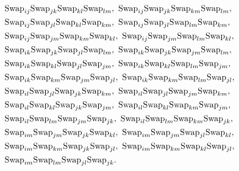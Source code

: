 \documentclass[12pt,dvipsnames,accepted=2016-08-18,a4paper,onecolumn]{quantumarticle}
\numberwithin{equation}{section}
\theoremstyle{definition}
\begin{document}
\begin{equation}\label{eq: quart}
 \begin{split}
 	&\textnormal{Swap}_{ij} \textnormal{Swap}_{jk} \textnormal{Swap}_{kl} \textnormal{Swap}_{lm}, \ 
 	\textnormal{Swap}_{ij} \textnormal{Swap}_{jk} \textnormal{Swap}_{km} \textnormal{Swap}_{lm}, \ \\
 	&\textnormal{Swap}_{ij} \textnormal{Swap}_{jl} \textnormal{Swap}_{kl} \textnormal{Swap}_{km}, \ 
 	\textnormal{Swap}_{ij} \textnormal{Swap}_{jl} \textnormal{Swap}_{lm} \textnormal{Swap}_{km}, \ \\
 	&\textnormal{Swap}_{ij} \textnormal{Swap}_{jm} \textnormal{Swap}_{km} \textnormal{Swap}_{kl}, \  
 	\textnormal{Swap}_{ij} \textnormal{Swap}_{jm} \textnormal{Swap}_{lm} \textnormal{Swap}_{kl}, \ \\
 	&\textnormal{Swap}_{ik} \textnormal{Swap}_{jk} \textnormal{Swap}_{jl} \textnormal{Swap}_{lm}, \ 
 	\textnormal{Swap}_{ik} \textnormal{Swap}_{jk} \textnormal{Swap}_{jm} \textnormal{Swap}_{lm}, \ \\
 	&\textnormal{Swap}_{ik} \textnormal{Swap}_{kl} \textnormal{Swap}_{jl} \textnormal{Swap}_{jm}, \ 
 	\textnormal{Swap}_{ik} \textnormal{Swap}_{kl} \textnormal{Swap}_{lm} \textnormal{Swap}_{jm}, \ \\
 	&\textnormal{Swap}_{ik} \textnormal{Swap}_{km} \textnormal{Swap}_{jm} \textnormal{Swap}_{jl}, \ 
 	\textnormal{Swap}_{ik} \textnormal{Swap}_{km} \textnormal{Swap}_{lm} \textnormal{Swap}_{jl}, \ \\
 	&\textnormal{Swap}_{il} \textnormal{Swap}_{jl} \textnormal{Swap}_{jk} \textnormal{Swap}_{km}, \ 
 	\textnormal{Swap}_{il} \textnormal{Swap}_{jl} \textnormal{Swap}_{jm} \textnormal{Swap}_{km}, \ \\
 	&\textnormal{Swap}_{il} \textnormal{Swap}_{kl} \textnormal{Swap}_{jk} \textnormal{Swap}_{jm}, \  
 	\textnormal{Swap}_{il} \textnormal{Swap}_{kl} \textnormal{Swap}_{km} \textnormal{Swap}_{jm}, \ \\
 	&\textnormal{Swap}_{il} \textnormal{Swap}_{lm} \textnormal{Swap}_{jm} \textnormal{Swap}_{jk}, \ 
 	\textnormal{Swap}_{il} \textnormal{Swap}_{lm} \textnormal{Swap}_{km} \textnormal{Swap}_{jk}, \ \\
 	&\textnormal{Swap}_{im} \textnormal{Swap}_{jm} \textnormal{Swap}_{jk} \textnormal{Swap}_{kl}, \ 
 	\textnormal{Swap}_{im} \textnormal{Swap}_{jm} \textnormal{Swap}_{jl} \textnormal{Swap}_{kl}, \ \\
 	&\textnormal{Swap}_{im} \textnormal{Swap}_{km} \textnormal{Swap}_{jk} \textnormal{Swap}_{jl}, \
 	\textnormal{Swap}_{im} \textnormal{Swap}_{km} \textnormal{Swap}_{kl} \textnormal{Swap}_{jl}, \ \\
 	&\textnormal{Swap}_{im} \textnormal{Swap}_{lm} \textnormal{Swap}_{jl} \textnormal{Swap}_{jk}.   
 \end{split}
\end{equation}
\end{document}
